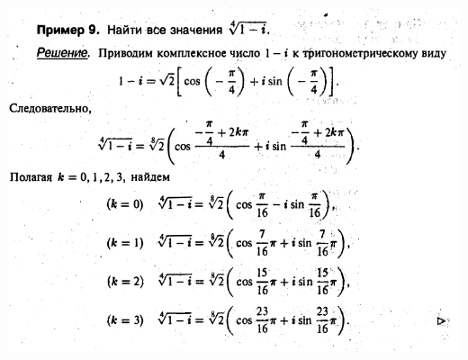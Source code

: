 \documentclass[a4paper, 12pt]{report}
\begin{document}
\begin{center}
	\includegraphics[scale=1.1]{pic10.png}
\end{center}
\end{document}
